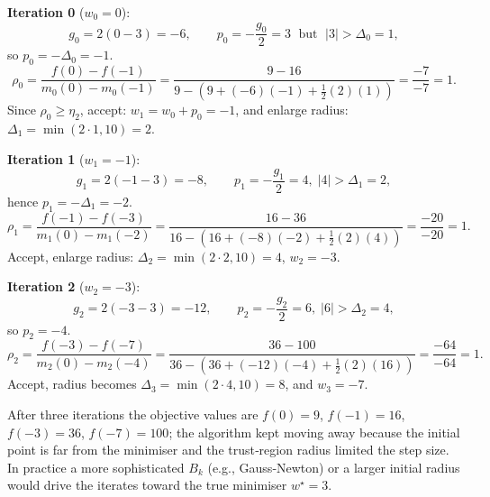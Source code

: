 \documentclass[11pt]{article}
\begin{document}
\bigskip
\noindent\textbf{Iteration 0} (\(w_{0}=0\)):
\[
g_{0}=2(0-3)=-6,\qquad p_{0}= -\frac{g_{0}}{2}=3\;\text{ but }\;|3|>\Delta_{0}=1,
\]
so $p_{0}=-\Delta_{0}=-1$.
\[
\rho_{0}= \frac{f(0)-f(-1)}{m_{0}(0)-m_{0}(-1)}
      =\frac{9-16}{9- (9+(-6)(-1)+\tfrac12(2)(1))}= \frac{-7}{-7}=1.
\]
Since $\rho_{0}\ge\eta_{2}$, accept: $w_{1}=w_{0}+p_{0}=-1$, and enlarge radius:
\(\Delta_{1}= \min(2\cdot1,10)=2\).

\medskip
\noindent\textbf{Iteration 1} (\(w_{1}=-1\)):
\[
g_{1}=2(-1-3)=-8,\qquad p_{1}= -\frac{g_{1}}{2}=4,\;|4|>\Delta_{1}=2,
\]
hence $p_{1}=-\Delta_{1}=-2$.
\[
\rho_{1}= \frac{f(-1)-f(-3)}{m_{1}(0)-m_{1}(-2)}
        = \frac{16-36}{16- (16+(-8)(-2)+\tfrac12(2)(4))}= \frac{-20}{-20}=1.
\]
Accept, enlarge radius: $\Delta_{2}= \min(2\cdot2,10)=4$, $w_{2}= -3$.

\medskip
\noindent\textbf{Iteration 2} (\(w_{2}=-3\)):
\[
g_{2}=2(-3-3)=-12,\qquad p_{2}= -\frac{g_{2}}{2}=6,\;|6|>\Delta_{2}=4,
\]
so $p_{2}=-4$.
\[
\rho_{2}= \frac{f(-3)-f(-7)}{m_{2}(0)-m_{2}(-4)}
        = \frac{36-100}{36- (36+(-12)(-4)+\tfrac12(2)(16))}= \frac{-64}{-64}=1.
\]
Accept, radius becomes $\Delta_{3}= \min(2\cdot4,10)=8$, and $w_{3}= -7$.

After three iterations the objective values are $f(0)=9$, $f(-1)=16$, $f(-3)=36$, $f(-7)=100$; the algorithm kept moving away because the initial point is far from the minimiser and the trust‑region radius limited the step size. In practice a more sophisticated $B_{k}$ (e.g., Gauss‑Newton) or a larger initial radius would drive the iterates toward the true minimiser $w^{\star}=3$.

\end{document}

